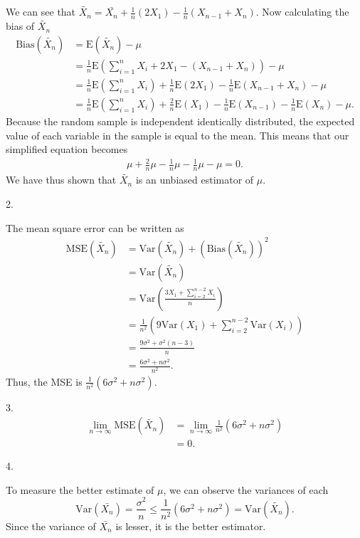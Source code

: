 \documentclass{article}
\begin{document}
We can see that $\tilde{X_n} = \bar{X_n} + \frac{1}{n}(2X_1)-\frac{1}{n}\left(X_{n-1}+X_n\right)$. Now calculating the bias of $\tilde{X_n}$
\begin{align*}
    \mbox{Bias}(\tilde{X_n}) &=\mbox{E}(\tilde{X_n}) - \mu\\
    &= \frac{1}{n}\mbox{E}\left(\sum_{i = 1}^{n}X_i + 2X_1 - (X_{n-1}+X_n)\right) - \mu\\
    &= \frac{1}{n}\mbox{E}\left(\sum_{i = 1}^{n}X_i\right)+\frac{1}{n}\mbox{E}(2X_1)-\frac{1}{n}\mbox{E}(X_{n-1}+X_n) - \mu\\
    &= \frac{1}{n}\mbox{E}\left(\sum_{i = 1}^{n}X_i\right)+\frac{2}{n}\mbox{E}(X_1)-\frac{1}{n}\mbox{E}(X_{n-1})-\frac{1}{n}\mbox{E}(X_n) - \mu\mbox{.}
\end{align*}
\hspace*{6mm}Because the random sample is independent identically distributed, the expected value of each variable in the sample is equal to the mean. This means that our simplified equation becomes
\begin{align*}
    \mu + \frac{2}{n}\mu -\frac{1}{n}\mu -\frac{1}{n}\mu -\mu = 0\mbox{.}
\end{align*}
We have thus shown that $\tilde{X_n}$ is an unbiased estimator of $\mu$.

2.

The mean square error can be written as
\begin{align*}
    \mbox{MSE}(\tilde{X_n}) &= \mbox{Var}(\tilde{X_n})+(\mbox{Bias}(\tilde{X_n}))^2\\
    &= \mbox{Var}(\tilde{X_n})\\
    &= \mbox{Var}\left(\frac{3X_1+\sum_{i = 2}^{n-2}X_i}{n}\right)\\
    &= \frac{1}{n^2}\left(9\mbox{Var}(X_1) + \sum_{i = 2}^{n-2}\mbox{Var}(X_i)\right)\\
    &= \frac{9\sigma^2 + \sigma^2(n - 3)}{n}\\
    &= \frac{6\sigma^2 + n\sigma^2}{n^2}\mbox{.}
\end{align*}
Thus, the MSE is $\frac{1}{n^2}(6\sigma^2 + n\sigma^2)$.

3.
\begin{align*}
    \lim_{n\rightarrow\infty}\mbox{MSE}(\tilde{X_n}) &= \lim_{n\rightarrow\infty}\frac{1}{n^2}(6\sigma^2 + n\sigma^2)\\
    &= 0\mbox{.}
\end{align*}

4.

To measure the better estimate of $\mu$, we can observe the variances of each
\begin{equation*}
    \mbox{Var}(\bar{X_n}) = \frac{\sigma^2}{n}\leq \frac{1}{n^2}(6\sigma^2 + n\sigma^2) = \mbox{Var}(\tilde{X_n})\mbox{.}
\end{equation*}
Since the variance of $\bar{X_n}$ is lesser, it is the better estimator.
\end{document}
